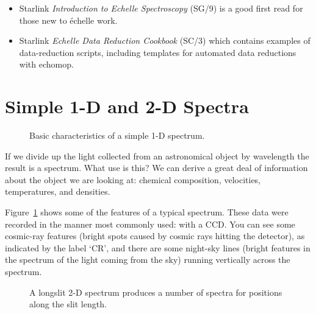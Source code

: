 \documentclass[twoside,11pt]{article}
\newcommand{\stardocinitials}  {SC}
\newcommand{\stardocnumber}    {7.2}
\newcommand{\stardocname}{\stardocinitials /\stardocnumber}
\newcommand{\htmlref}[2]{#1}
\newcommand{\xref}[3]{#1}
\newcommand{\xlabel}[1]{}
\newcommand{\mlabel}[1]{\xlabel{#1}\label{#1}}
\newcommand{\scspec}[2]{#1}
\newcommand{\scspec}[2]{#2}
\begin{document}
\begin{itemize}

\item Starlink \xref{{\sl Introduction to Echelle Spectroscopy}
(SG/9)}{sg9}{} is a good first read for those new to
\'{e}chelle work.

\item Starlink \xref{{\sl Echelle Data Reduction Cookbook}
(SC/3)}{sc3}{} which contains examples of
data-reduction scripts, including templates for automated data
reductions with \xref{{\sc echomop}}{sun152}{}\cite{echomop}\@.

\end{itemize}


\section{\mlabel{simple_spectrum}Simple 1-D and 2-D Spectra}
\markboth{Simple 1-D and 2-D Spectra}{\stardocname}

\begin{figure}
\begin{center}
  \scspec{\leavevmode\epsfysize=105mm\epsfbox{sc7_01.eps}}
         {\leavevmode\epsfysize=136mm}

  \parbox{140mm}{
    \caption{Basic characteristics of a simple 1-D spectrum.}
    \label{fi_simple_spectrum}
  }
\end{center}
\end{figure}

If we divide up the light collected from an astronomical object by
wavelength the result is a spectrum.  What use is this?  We can derive
a great deal of information about the object we are looking at: chemical
composition, velocities, temperatures, and densities.

\scspec{Figure~\ref{fi_simple_spectrum}}{The figure above}
shows some of the features of a typical spectrum.
These data were recorded in the manner most commonly used: with a
\htmlref{CCD}{gl_ccd}.
You can see some \htmlref{cosmic-ray features}{gl_cosmic_ray}
(bright spots caused by cosmic rays hitting the detector),
as indicated by the label `CR', and
there are some night-sky lines (bright features in the spectrum of
the light coming from the sky) running vertically across the spectrum.


\begin{figure}
\begin{center}
  \scspec{\leavevmode\epsfysize=105mm\epsfbox{sc7_01b.eps}}
         {\leavevmode\epsfysize=136mm}

  \parbox{140mm}{
    \caption{A longslit 2-D spectrum produces a number of spectra for
             positions along the slit length.}
    \label{fi_twod_spectrum}
  }
\end{center}
\end{figure}
\end{document}
